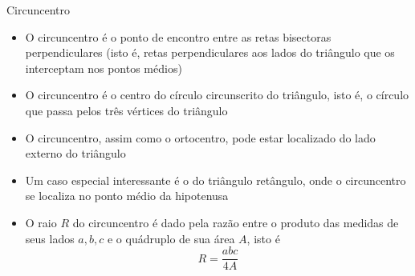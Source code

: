 \begin{frame}[fragile]{Circuncentro}

    \begin{itemize}
        \item O circuncentro é o ponto de encontro entre as retas bisectoras perpendiculares (isto é, retas perpendiculares aos lados do triângulo que os interceptam nos pontos médios)
        \pause

        \item O circuncentro é o centro do círculo circunscrito do triângulo, isto é, o círculo 
            que passa pelos três vértices do triângulo
        \pause

        \item O circuncentro, assim como o ortocentro, pode estar localizado do lado externo do triângulo
        \pause

        \item Um caso especial interessante é o do triângulo retângulo, onde o circuncentro se 
            localiza no ponto médio da hipotenusa
        \pause

        \item O raio $R$ do circuncentro é dado pela razão entre o produto das medidas de seus 
            lados $a, b, c$ e o quádruplo de sua área $A$, isto é
        \[
            R = \frac{abc}{4A}
        \]

    \end{itemize}

\end{frame}

